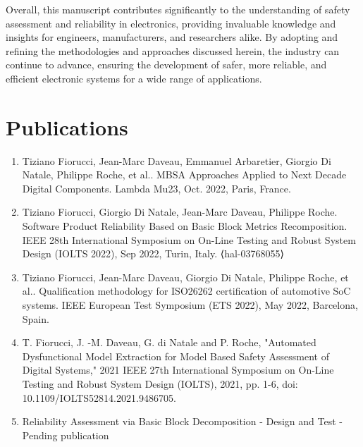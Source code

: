 \documentclass[./dissertation.tex]{subfiles}
\begin{document}
Overall, this manuscript contributes significantly to the understanding of safety assessment and reliability in electronics, providing invaluable knowledge and insights for engineers, manufacturers, and researchers alike. By adopting and refining the methodologies and approaches discussed herein, the industry can continue to advance, ensuring the development of safer, more reliable, and efficient electronic systems for a wide range of applications.



\section{Publications}

\begin{enumerate}
    \item Tiziano Fiorucci, Jean-Marc Daveau, Emmanuel Arbaretier, Giorgio Di Natale, Philippe Roche, et al.. MBSA Approaches Applied to Next Decade Digital Components. Lambda Mu23, Oct. 2022, Paris, France. 
    \item Tiziano Fiorucci, Giorgio Di Natale, Jean-Marc Daveau, Philippe Roche. Software Product Reliability Based on Basic Block Metrics Recomposition. IEEE 28th International Symposium on On-Line Testing and Robust System Design (IOLTS 2022), Sep 2022, Turin, Italy. ⟨hal-03768055⟩ 
    \item Tiziano Fiorucci, Jean-Marc Daveau, Giorgio Di Natale, Philippe Roche, et al.. Qualification methodology for ISO26262 certification of automotive SoC systems. IEEE European Test Symposium (ETS 2022), May 2022, Barcelona, Spain.
    \item T. Fiorucci, J. -M. Daveau, G. di Natale and P. Roche, "Automated Dysfunctional Model Extraction for Model Based
Safety Assessment of Digital Systems," 2021 IEEE 27th International Symposium on On-Line Testing and Robust
System Design (IOLTS), 2021, pp. 1-6, doi: 10.1109/IOLTS52814.2021.9486705.
    \item Reliability Assessment via Basic Block Decomposition - Design and Test - Pending publication
\end{enumerate}
\newpage	
\end{document}

